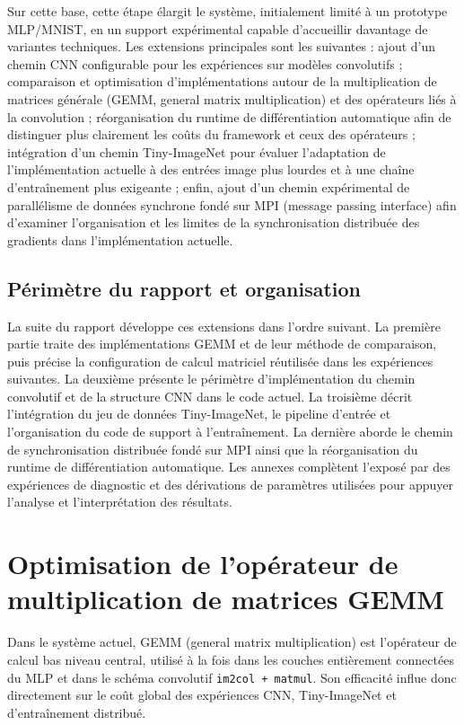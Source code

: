 \documentclass[a4paper,11pt,oneside]{article}
\begin{document}
Sur cette base, cette étape élargit le système, initialement limité à un prototype MLP/MNIST, en un support expérimental capable d'accueillir davantage de variantes techniques. Les extensions principales sont les suivantes : ajout d'un chemin CNN configurable pour les expériences sur modèles convolutifs ; comparaison et optimisation d'implémentations autour de la multiplication de matrices générale (GEMM, general matrix multiplication) et des opérateurs liés à la convolution ; réorganisation du runtime de différentiation automatique afin de distinguer plus clairement les coûts du framework et ceux des opérateurs ; intégration d'un chemin Tiny-ImageNet pour évaluer l'adaptation de l'implémentation actuelle à des entrées image plus lourdes et à une chaîne d'entraînement plus exigeante ; enfin, ajout d'un chemin expérimental de parallélisme de données synchrone fondé sur MPI (message passing interface) afin d'examiner l'organisation et les limites de la synchronisation distribuée des gradients dans l'implémentation actuelle.

\subsection{Périmètre du rapport et organisation}
La suite du rapport développe ces extensions dans l'ordre suivant. La première partie traite des implémentations GEMM et de leur méthode de comparaison, puis précise la configuration de calcul matriciel réutilisée dans les expériences suivantes. La deuxième présente le périmètre d'implémentation du chemin convolutif et de la structure CNN dans le code actuel. La troisième décrit l'intégration du jeu de données Tiny-ImageNet, le pipeline d'entrée et l'organisation du code de support à l'entraînement. La dernière aborde le chemin de synchronisation distribuée fondé sur MPI ainsi que la réorganisation du runtime de différentiation automatique. Les annexes complètent l'exposé par des expériences de diagnostic et des dérivations de paramètres utilisées pour appuyer l'analyse et l'interprétation des résultats.

\section{Optimisation de l'opérateur de multiplication de matrices GEMM}

Dans le système actuel, GEMM (general matrix multiplication) est l'opérateur de calcul bas niveau central, utilisé à la fois dans les couches entièrement connectées du MLP et dans le schéma convolutif \texttt{im2col + matmul}. Son efficacité influe donc directement sur le coût global des expériences CNN, Tiny-ImageNet et d'entraînement distribué.
\end{document}
